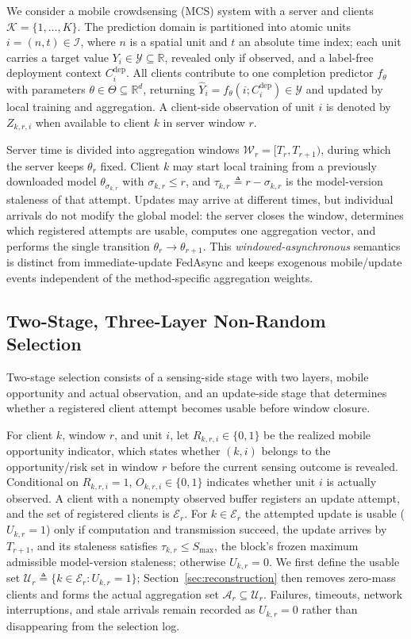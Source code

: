 \documentclass[letterpaper,journal]{IEEEtran}
\begin{document}
We consider a mobile crowdsensing (MCS) system with a server and clients
$\mathcal{K}=\{1,\ldots,K\}$.  The prediction domain is partitioned into atomic
units $i=(n,t)\in\mathcal{I}$, where $n$ is a spatial unit and $t$ an absolute
time index; each unit carries a target value
$Y_i\in\mathcal{Y}\subseteq\mathbb{R}$, revealed only if observed, and a
label-free deployment context $C_i^{\mathrm{dep}}$.  All clients contribute to
one completion predictor $f_{\theta}$ with parameters
$\theta\in\Theta\subseteq\mathbb{R}^{d}$, returning
$\widehat Y_i=f_{\theta}(i;C_i^{\mathrm{dep}})\in\mathcal{Y}$ and updated by
local training and aggregation.  A client-side observation of unit $i$ is
denoted by $Z_{k,r,i}$ when available to client $k$ in server window $r$.

Server time is divided into aggregation windows
$\mathcal{W}_r=[T_r,T_{r+1})$, during which the server keeps $\theta_r$ fixed.
Client $k$ may start local training from a previously downloaded model
$\theta_{\sigma_{k,r}}$ with $\sigma_{k,r}\le r$, and
$\tau_{k,r}\triangleq r-\sigma_{k,r}$ is the model-version staleness of that
attempt.  Updates may arrive at different times, but individual arrivals do not
modify the global model: the server closes the window, determines which
registered attempts are usable, computes one aggregation vector, and performs the
single transition $\theta_r\rightarrow\theta_{r+1}$.  This
\emph{windowed-asynchronous} semantics is distinct from immediate-update
FedAsync and keeps exogenous mobile/update events independent of the
method-specific aggregation weights.

\subsection{Two-Stage, Three-Layer Non-Random Selection}
\label{subsec:selection_process}

Two-stage selection consists of a sensing-side stage with two
layers, mobile opportunity and actual observation, and an update-side stage that
determines whether a registered client attempt becomes usable before window
closure.

For client $k$, window $r$, and unit $i$, let
$R_{k,r,i}\in\{0,1\}$ be the realized mobile opportunity indicator, which states
whether $(k,i)$ belongs to the opportunity/risk set in window $r$ before the
current sensing outcome is revealed.  Conditional on $R_{k,r,i}=1$,
$O_{k,r,i}\in\{0,1\}$ indicates whether unit $i$ is actually observed.  A client
with a nonempty observed buffer registers an update attempt, and the set of
registered clients is $\mathcal{E}_r$.  For $k\in\mathcal{E}_r$ the attempted
update is usable ($U_{k,r}=1$) only if computation and transmission succeed, the
update arrives by $T_{r+1}$, and its staleness satisfies
$\tau_{k,r}\le S_{\max}$, the block's frozen maximum admissible model-version
staleness; otherwise $U_{k,r}=0$.  We first define the usable set
$\mathcal{U}_r\triangleq\{k\in\mathcal{E}_r:U_{k,r}=1\}$;
Section~\ref{sec:reconstruction} then removes zero-mass clients and forms the
actual aggregation set $\mathcal{A}_r\subseteq\mathcal{U}_r$.  Failures, timeouts, network
interruptions, and stale arrivals remain recorded as $U_{k,r}=0$ rather than
disappearing from the selection log.
\end{document}
